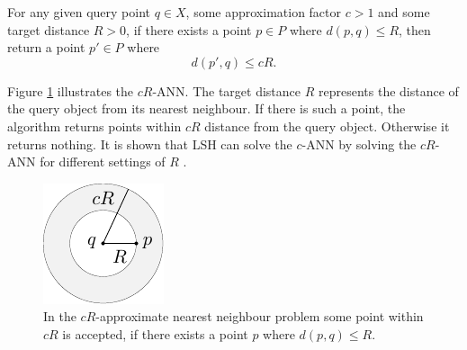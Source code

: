 \begin{definition}
    For any given query point $q \in X$, some approximation factor $c > 1$ and some target distance $R > 0$, if there exists a point $p \in P$ where $d(p,q) \leq R$, then return a point $p' \in P$ where
    \begin{equation}
        d(p',q) \leq cR.
    \end{equation}
\end{definition}

Figure \ref{fig:nearest_neighbour} illustrates  the $cR$-ANN. The target distance $R$ represents the distance of the query object from its nearest neighbour. If there is such a point, the algorithm returns points within $cR$ distance from the query object. Otherwise it returns nothing. It is shown that LSH can solve the $c$-ANN by solving the $cR$-ANN for different settings of $R$ \cite{indyk_approximate_1998}.

\begin{figure}[t!]
    \centering
    \includegraphics[width=0.3\linewidth]{tikz/nearest_neighbour.pdf}
    \caption{In the $cR$-approximate nearest neighbour problem some point within $cR$ is accepted, if there exists a point $p$ where $d(p,q) \leq R$.}
    \label{fig:nearest_neighbour}
\end{figure}